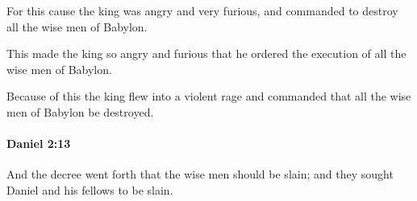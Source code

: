 			\begin{versebox}
					\item[BHS] 
					\item[LXX] 
					\item[ASV] For this cause the king was angry and very furious, and commanded to destroy all the wise men of Babylon.
					\item[NIV] This made the king so angry and furious that he ordered the execution of all the wise men of Babylon.
					\item[NRSV] Because of this the king flew into a violent rage and commanded that all the wise men of Babylon be destroyed.
			\end{versebox}

		\paragraph{Daniel 2:13} %
			\label{DANIEL-2-13}

			And the decree went forth that the wise men should be slain; and they sought Daniel and his fellows to be slain.

